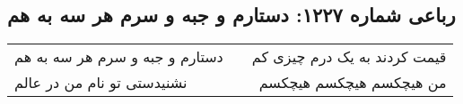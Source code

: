 \begin{center}
\section*{رباعی شماره ۱۲۲۷: دستارم و جبه و سرم هر سه به هم}
\label{sec:1227}
\begin{longtable}{l p{0.5cm} r}
دستارم و جبه و سرم هر سه به هم
&&
قیمت کردند به یک درم چیزی کم
\\
نشنیدستی تو نام من در عالم
&&
من هیچکسم هیچکسم هیچکسم
\\
\end{longtable}
\end{center}

